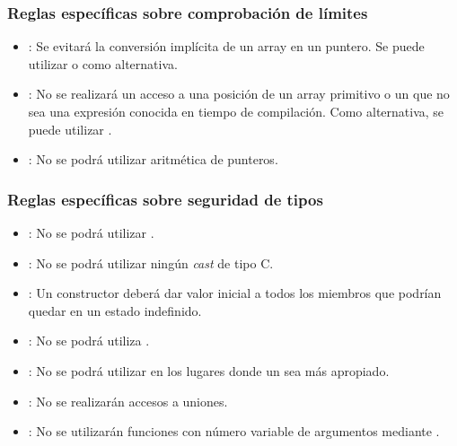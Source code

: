 \subsubsection{Reglas específicas sobre comprobación de límites}

\begin{itemize}

\item {}:
Se evitará la conversión implícita de un array en un puntero.
Se puede utilizar  o 
como alternativa.

\item {}:
No se realizará un acceso a una posición de un array primitivo
o un  que no sea una expresión conocida en
tiempo de compilación. Como alternativa, se puede utilizar
.

\item {}:
No se podrá utilizar aritmética de punteros.

\end{itemize}

\subsubsection{Reglas específicas sobre seguridad de tipos}

\begin{itemize}

\item {}:
No se podrá utilizar .

\item {}:
No se podrá utilizar ningún \emph{cast} de tipo C.

\item {}:
Un constructor deberá dar valor inicial a todos los miembros que podrían
quedar en un estado indefinido.

\item {}:
No se podrá utiliza .

\item {}:
No se podrá utilizar  en los lugares
donde un  sea más apropiado.

\item {}:
No se realizarán accesos a uniones.

\item {}:
No se utilizarán funciones con número variable de argumentos mediante
.

\end{itemize}
